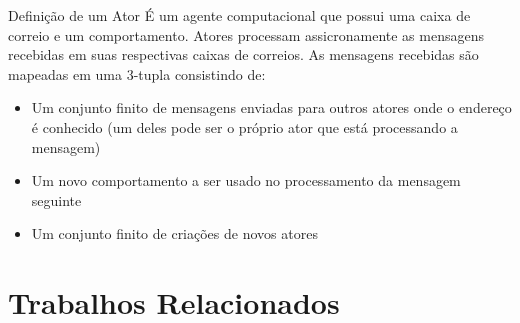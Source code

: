 \documentclass{beamer}
\begin{document}
{{		\begin{beamerboxesrounded}{Defini\c{c}\~ao de um Ator \cite{Agha1986}}
			\'E um agente computacional que possui uma caixa de correio e um comportamento.
			Atores processam assicronamente as mensagens recebidas em suas respectivas caixas de correios. 
			As mensagens recebidas s\~ao mapeadas em uma $3$-tupla consistindo de: 
			\begin{itemize}
				\item Um conjunto finito de mensagens enviadas para outros atores onde o endere\c{c}o \'e conhecido
				(um deles pode ser o pr\'oprio ator que est\'a processando a mensagem)
				\item Um novo comportamento a ser usado no processamento da mensagem seguinte
				\item Um conjunto finito de cria\c{c}\~oes de novos atores
			\end{itemize}
		\end{beamerboxesrounded}
	}
}

\section{Trabalhos Relacionados}
\end{document}
